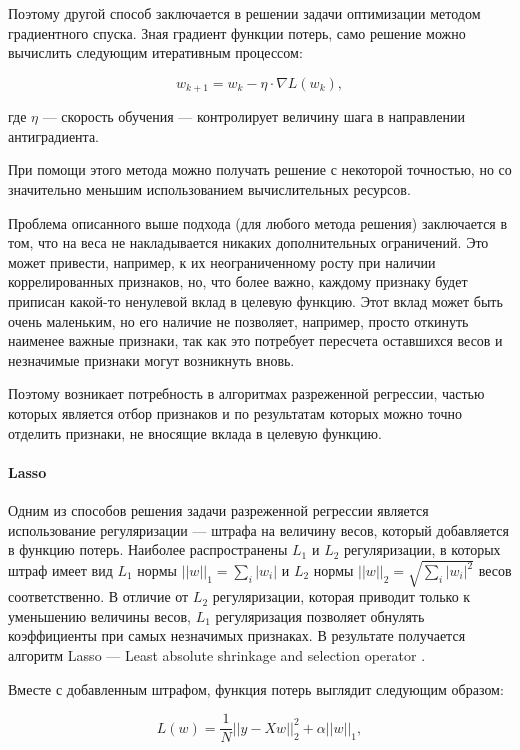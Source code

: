 Поэтому другой способ заключается в решении задачи оптимизации методом градиентного спуска. Зная градиент функции потерь, само решение можно вычислить следующим итеративным процессом:

\begin{equation}
w_{k+1} = w_k - \eta \cdot \nabla L(w_k), 
\end{equation}

где $\eta$ --- скорость обучения --- контролирует величину шага в направлении антиградиента.

При помощи этого метода можно получать решение с некоторой точностью, но со значительно меньшим использованием вычислительных ресурсов.

Проблема описанного выше подхода (для любого метода решения) заключается в том, что на веса не накладывается никаких дополнительных ограничений. Это может привести, например, к их неограниченному росту при наличии коррелированных признаков, но, что более важно, каждому признаку будет приписан какой-то ненулевой вклад в целевую функцию. Этот вклад может быть очень маленьким, но его наличие не позволяет, например, просто откинуть наименее важные признаки, так как это потребует пересчета оставшихся весов и незначимые признаки могут возникнуть вновь.

Поэтому возникает потребность в алгоритмах разреженной регрессии, частью которых является отбор признаков и по результатам которых можно точно отделить признаки, не вносящие вклада в целевую функцию.

\paragraph{Lasso}

Одним из способов решения задачи разреженной регрессии является использование регуляризации --- штрафа на величину весов, который добавляется в функцию потерь. Наиболее распространены $L_1$ и $L_2$ регуляризации, в которых штраф имеет вид $L_1$ нормы $||w||_1 = \sum_i |w_i|$ и $L_2$ нормы $||w||_2 = \sqrt{\sum_i |w_i|^2}$ весов соответственно. В отличие от $L_2$ регуляризации, которая приводит только к уменьшению величины весов, $L_1$ регуляризация позволяет обнулять коэффициенты при самых незначимых признаках. В результате получается алгоритм Lasso --- Least absolute shrinkage and selection operator \cite{lasso}.

Вместе с добавленным штрафом, функция потерь выглядит следующим образом:

\begin{equation}
L(w) = \frac{1}{N} ||y - X w||^2_2 + \alpha ||w||_1,
\end{equation}

